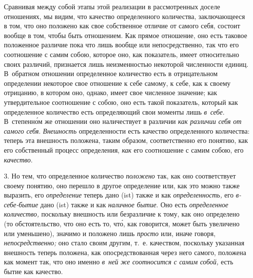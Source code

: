 Сравнивая между собой этапы этой реализации в рассмотренных доселе отношениях,
мы видим, что качество определенного количества, заключающееся в том, что оно
положено как свое собственное отличие от самого себя, состоит вообще в том,
чтобы быть отношением. Как прямое отношение, оно есть таковое положенное
различие пока что лишь вообще или непосредственно, так что его соотношение с
самим собою, которое оно, как показатель, имеет относительно своих различий,
признается лишь неизменностью некоторой численности единиц. В~обратном
отношении определенное количество есть в отрицательном определении некоторое
свое отношение к себе самому, к себе, как к своему отрицанию, в котором оно,
однако, имеет свое численное значение; как утвердительное соотношение с собою,
оно есть такой показатель, который как определенное количество есть
определяющий свои моменты лишь {\em в~себе}. В~степенн\'{о}м же отношении оно
наличествует в различии {\em как различии себя от самого себя}. {\em Внешность}
определенности есть качество определенного количества: теперь эта внешность
положена, таким образом, соответственно его понятию, как его собственный
процесс определения, {\em как} его соотношение с самим собою, его
{\em качество}.

3. Но тем, что определенное количество {\em положено} так, как оно
соответствует своему понятию, оно перешло в другое определение или, как это
можно также выразить, его {\em определение} теперь дано (ist) также и как
{\em определенность,} его {\em в-себе-бытие} дано (ist) также и как
{\em наличное бытие}. Оно есть {\em определенное количество,} поскольку
внешность или безразличие к тому, как оно определено (то обстоятельство, что
оно есть то, чт\'{о}, как говорится, может быть увеличено или уменьшено),
значимо и положено лишь {\em просто} или, иначе говоря, {\em непосредственно;}
оно стало своим другим, т.~е. качеством, поскольку указанная внешность теперь
положена, как опосредствованная через него самого, положена как момент так, что
оно именно {\em в~ней же соотносится с самим собой,} есть бытие как качество.

